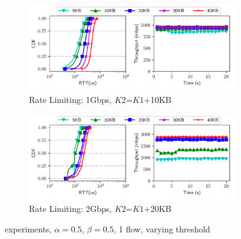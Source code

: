 \begin{figure}[!t]
\centering
\begin{subfigure}[b]{0.9\textwidth}
\centering
\includegraphics[width=\textwidth]{rate_limiter/raw_data/spring_benchmark/1gbps.pdf}
\caption{Rate Limiting: 1Gbps, $K2$=$K1$+10KB}
\label{fig:spring-1g} 
\end{subfigure}
\begin{subfigure}[b]{0.9\textwidth}
\centering
\includegraphics[width=\textwidth]{rate_limiter/raw_data/spring_benchmark/2gbps.pdf}
\caption{Rate Limiting: 2Gbps, $K2$=$K1$+20KB}
\label{fig:spring-2g} 
\end{subfigure}
\caption{\nametwo experiments, $\alpha=0.5$, $\beta=0.5$, 1 flow, varying threshold}
\label{fig:spring} 
\end{figure}

